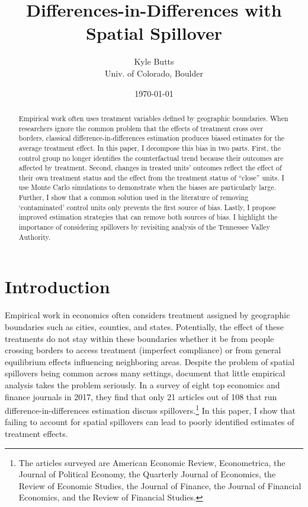 \documentclass[11pt]{article}
\title{\color{navyblue} Differences-in-Differences with Spatial Spillover}
\author{\normalsize Kyle Butts\\{\footnotesize Univ. of Colorado, Boulder}}
\date{\footnotesize\today}
\begin{document}
\begin{titlepage}
    \maketitle
    
    \begin{abstract}
        Empirical work often uses treatment variables defined by geographic boundaries. When researchers ignore the common problem that the effects of treatment cross over borders, classical difference-in-differences estimation produces biased estimates for the average treatment effect. In this paper, I decompose this bias in two parts. First, the control group no longer identifies the counterfactual trend because their outcomes are affected by treatment. Second, changes in treated units' outcomes reflect the effect of their own treatment status and the effect from the treatment status of ``close'' units. I use Monte Carlo simulations to demonstrate when the biases are particularly large. Further, I show that a common solution used in the literature of removing `contaminated' control units only prevents the first source of bias. Lastly, I propose improved estimation strategies that can remove both sources of bias. I highlight the importance of considering spillovers by revisiting analysis of the Tennessee Valley Authority.
    \end{abstract}
\end{titlepage}

\section{Introduction}

Empirical work in economics often considers treatment assigned by geographic boundaries such as cities, counties, and states. Potentially, the effect of these treatments do not stay within these boundaries whether it be from people crossing borders to access treatment (imperfect compliance) or from general equilibrium effects influencing neighboring areas. Despite the problem of spatial spillovers being common across many settings, \citet{Berg_Streitz_2019} document that little empirical analysis takes the problem seriously. In a survey of eight top economics and finance journals in 2017, they find that only 21 articles out of 108 that run difference-in-differences estimation discuss spillovers.\footnote{The articles surveyed are American Economic Review, Econometrica, the Journal of Political Economy, the Quarterly Journal of Economics, the Review of Economic Studies, the Journal of Finance, the Journal of Financial Economics, and the Review of Financial Studies.} In this paper, I show that failing to account for spatial spillovers can lead to poorly identified estimates of treatment effects.
\end{document}
